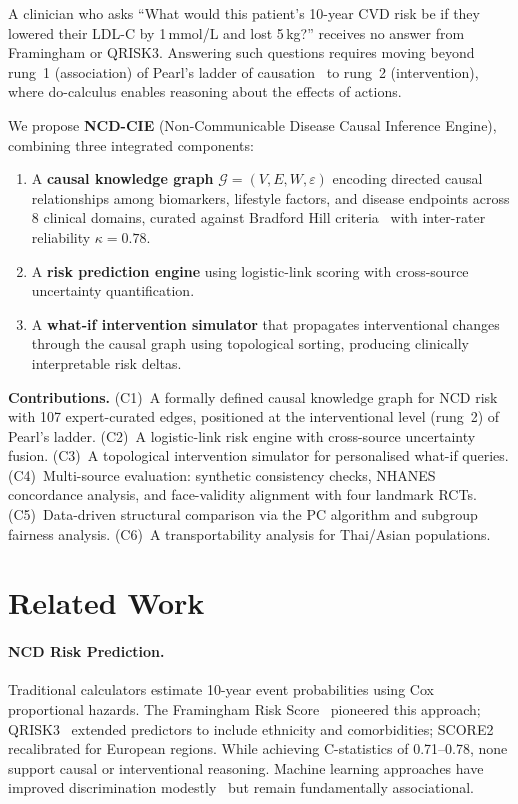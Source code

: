 \documentclass[runningheads]{llncs}
\begin{document}
A clinician who asks ``What would this patient's 10-year CVD risk be
if they lowered their LDL-C by 1\,mmol/L and lost 5\,kg?'' receives
no answer from Framingham or QRISK3.  Answering such questions
requires moving beyond rung~1 (association) of Pearl's ladder of
causation~\cite{pearl2018book} to rung~2 (intervention), where
do-calculus enables reasoning about the effects of actions.

We propose \textbf{NCD-CIE} (Non-Communicable Disease Causal Inference
Engine), combining three integrated components:
\begin{enumerate}
\item A \textbf{causal knowledge graph} $\mathcal{G}=(V,E,W,\varepsilon)$
  encoding directed causal relationships among biomarkers, lifestyle
  factors, and disease endpoints across 8 clinical domains, curated
  against Bradford Hill criteria~\cite{hill1965environment} with
  inter-rater reliability $\kappa=0.78$.
\item A \textbf{risk prediction engine} using logistic-link scoring with
  cross-source uncertainty quantification.
\item A \textbf{what-if intervention simulator} that propagates
  interventional changes through the causal graph using topological
  sorting, producing clinically interpretable risk deltas.
\end{enumerate}

\noindent\textbf{Contributions.}
(C1)~A formally defined causal knowledge graph for NCD risk with 107
expert-curated edges, positioned at the interventional level (rung~2)
of Pearl's ladder.
(C2)~A logistic-link risk engine with cross-source uncertainty fusion.
(C3)~A topological intervention simulator for personalised what-if queries.
(C4)~Multi-source evaluation: synthetic consistency checks, NHANES
concordance analysis, and face-validity alignment with four landmark RCTs.
(C5)~Data-driven structural comparison via the PC algorithm and subgroup
fairness analysis.
(C6)~A transportability analysis for Thai/Asian populations.

\section{Related Work}\label{sec:related}

\paragraph{NCD Risk Prediction.}
Traditional calculators estimate 10-year event probabilities using Cox
proportional hazards.  The Framingham Risk
Score~\cite{dagostino2008framingham} pioneered this approach;
QRISK3~\cite{hippisley2017qrisk3} extended predictors to include
ethnicity and comorbidities; SCORE2~\cite{score22021} recalibrated
for European regions.  While achieving C-statistics of 0.71--0.78,
none support causal or interventional reasoning.  Machine learning
approaches have improved discrimination
modestly~\cite{alaa2019attentive} but remain fundamentally
associational.
\end{document}
